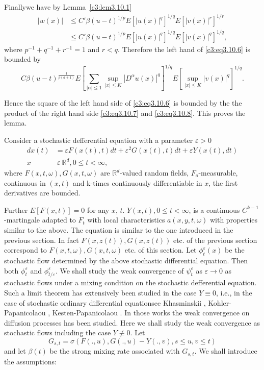 Finally\pageoriginale we have by Lemma~\ref{c3:lem3.10.1}
\begin{align*}
  |w(x)|& \leq C' \beta(u-t)^{1 /p} E[|u(x)|^q]^{1 /q} E[|v(x)|^r]^{1 /r}\\
  &\leq C' \beta(u-t)^{1 /p} E[|u(x)|^q]^{1 /q} E[|v(x)|^q]^{1 /q},
\end{align*}
where $p^{-1} + q^{-1} + r^{-1} =1$ and $r<q$. Therefore the left hand
of \eqref{c3:eq3.10.6} is bounded by  
\begin{equation*}
  C \beta (u-t)^{\frac{1}{p(d+1)}} E[\sum_{|\alpha| \leq 1} \sup_{|x|
      \leq K} |D^{\alpha}u(x)|^{q}]^{1/ q} E[\sup_{|x|\leq
      K}|v(x)|^q]^{1 /q}. \tag{3.10.8}\label{c3:eq3.10.8} 
\end{equation*}

Hence the square of the left hand side of \eqref{c3:eq3.10.6} is bounded by the
the product of the right hand side \ref{c3:eq3.10.7} and \eqref{c3:eq3.10.8}. This
proves the lemma. 

Consider a stochastic defferential equation with a parameter $\varepsilon > 0$
\begin{align*}
  dx(t) &= \varepsilon F(x(t),t) dt + \varepsilon^2 G(x(t),t)dt +
  \varepsilon Y(x(t),dt) \tag{3.10.9}\label{c3:eq3.10.9}\\
x~ & ~\varepsilon~ \mathbb{R}^d,  0 \leq t < \infty,
\end{align*}
where $F(x,t, \omega),G(x,t, \omega)$ are $\mathbb{R}^d$-valued random
fields, $F_o$-measurable, continuous in $(x,t)$ and k-times
continuously differentiable in $x$, the first derivatives are
bounded. 

Further $E[F(x,t)] =0$ for any $x$, $t$. $Y(x,t),0 \leq t < \infty$, is a
continuous $C^{k-1}$-martingale adapted to $F_t$ with local
characteristics $a (x, y,t, \omega)$ with properties similar to the
above. The equation is similar to the one introduced in the previous
section. In fact $F(x,z(t)), G(x,z(t))$ etc. of the previous section
correspond to $F(x,t, \omega),G(x,t, \omega)$ etc. of this
section. Let $\phi^{\varepsilon}_t(x)$ be the stochastic flow
determined by the above stochastic differential equation. Then both
$\phi^{\varepsilon}_t$ and $\phi^{\varepsilon}_{t/ \varepsilon}$. We
shall study the weak convergence of $\psi^{\varepsilon}_t$ as
$\varepsilon \to 0$ as stochastic flows under a mixing condition on 
the stochastic defferential equation. Such a limit theorem has
extensively been studied in the case $Y \equiv 0$, i.e.,  in the case
of stochastic ordinary differential equation\pageoriginale see Khasminskii \cite{17},
Kohler-Papanicolaou \cite{28}, Kesten-Papanicolaou \cite{15}. In those works the
weak convergence on diffusion processes has been studied. Here we
shall study the weak convergence as stochastic flows including the
case $Y \not \equiv 0$. Let 
$$
G_{s,t} = \sigma(F(.,u), G(.,u) -   Y(.,v), s \leq u, v \leq t)
$$
and let $\beta(t)$ be the strong mixing rate associated with
$G_{s,t}$. We shall introduce the assumptions: 

